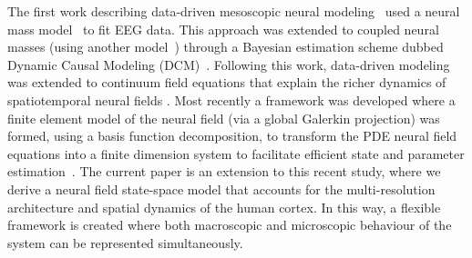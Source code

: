 \documentclass[journal,a4paper]{IEEEtran}
\begin{document}
The first work describing data-driven mesoscopic neural modeling~\cite{Valdes1999} used a neural mass model~\cite{LopesDaSilva1976,Zetterberg1978} to fit EEG data. This approach was extended to coupled neural masses (using another model~\cite{Jansen1995}) through a Bayesian estimation scheme dubbed Dynamic Causal Modeling (DCM)~\cite{David2003}. Following this work, data-driven modeling was extended to continuum field equations that explain the richer dynamics of spatiotemporal neural fields \cite{Galka2008,schiff2008kalman,Daunizeau2009}. Most recently a framework was developed where a finite element model of the neural field (via a global Galerkin projection) was formed, using a basis function decomposition, to transform the PDE neural field equations into a finite dimension system to facilitate efficient state and parameter estimation~\cite{Freestone2011}. The current paper is an extension to this recent study, where we derive a neural field state-space model that accounts for the multi-resolution architecture and spatial dynamics of the human cortex. In this way, a flexible framework is created where both macroscopic and microscopic behaviour of the system can be represented simultaneously.
\end{document}
